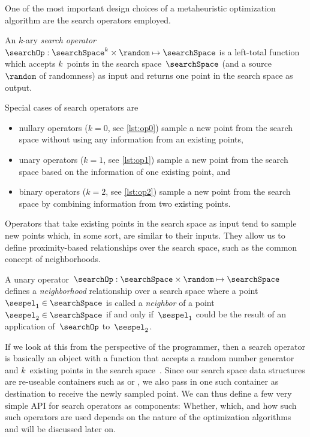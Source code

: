 %
\label{sec:searchOperators}%
%
One of the most important design choices of a metaheuristic optimization algorithm are the search operators employed.%
%
%
%
\begin{definition}%
\label{def:searchOp}%
An $k$-ary \emph{search operator}~$\searchOp:\searchSpace^k\times\random\mapsto\searchSpace$ is a left-total function which accepts $k$~points in the search space~$\searchSpace$ (and a source~$\random$ of randomness) as input and returns one point in the search space as output.%
\end{definition}%
%
Special cases of search operators are%
%
\begin{itemize}%
\item nullary operators ($k=0$, see \autoref{lst:op0}) sample a new point from the search space without using any information from an existing points,%
\item unary operators ($k=1$, see \autoref{lst:op1}) sample a new point from the search space based on the information of one existing point, and%
\item binary operators ($k=2$, see \autoref{lst:op2}) sample a new point from the search space by combining information from two existing points.%
\end{itemize}%
%
Operators that take existing points in the search space as input tend to sample new points which, in some sort, are similar to their inputs.
They allow us to define proximity-based relationships over the search space, such as the common concept of neighborhoods.

\begin{definition}[Neighborhood]
A unary operator~$\searchOp:\searchSpace\times\random\mapsto\searchSpace$ defines a \emph{neighborhood} relationship over a search space where a point~$\sespel_1\in\searchSpace$ is called a \emph{neighbor} of a point~$\sespel_2\in\searchSpace$ if and only if~$\sespel_1$ could be the result of an application of~$\searchOp$ to~$\sespel_2$.%
\end{definition}%
%
\endhsection%
%
%
%
If we look at this from the perspective of the programmer, then a search operator is basically an object with a function that accepts a random number generator and $k$~existing points in the search space~\searchSpace.
Since our search space data structures are re-useable containers such as  or \numpyndarrays, we also pass in one such container as destination to receive the newly sampled point.
We can thus define a few very simple API for search operators as components:%
%
%
%
%
%
%
%
Whether, which, and how such such operators are used depends on the nature of the optimization algorithms and will be discussed later on.

